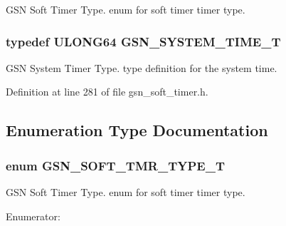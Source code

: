 GSN Soft Timer Type. enum for soft timer timer type. 

\hypertarget{a00673_gad1e755eb904493a09bf8df25a4519bf0}{
\subsubsection[{GSN\_\-SYSTEM\_\-TIME\_\-T}]{\setlength{\rightskip}{0pt plus 5cm}typedef {\bf ULONG64} {\bf GSN\_\-SYSTEM\_\-TIME\_\-T}}}
\label{a00673_gad1e755eb904493a09bf8df25a4519bf0}


GSN System Timer Type. type definition for the system time. 



Definition at line 281 of file gsn\_\-soft\_\-timer.h.



\subsection{Enumeration Type Documentation}
\hypertarget{a00673_ga599ea0a212c1bcd484a64610d070b5af}{
\subsubsection[{GSN\_\-SOFT\_\-TMR\_\-TYPE\_\-T}]{\setlength{\rightskip}{0pt plus 5cm}enum {\bf GSN\_\-SOFT\_\-TMR\_\-TYPE\_\-T}}}
\label{a00673_ga599ea0a212c1bcd484a64610d070b5af}


GSN Soft Timer Type. enum for soft timer timer type. 

\begin{Desc}
\item[Enumerator: ]\par
\begin{description}
\item[{\em 
\hypertarget{a00673_gga599ea0a212c1bcd484a64610d070b5afaed34a4f447dd6a4da5771c0a29d502c3}{
GSN\_\-SOFT\_\-TMR\_\-ONESHOT}
\label{a00673_gga599ea0a212c1bcd484a64610d070b5afaed34a4f447dd6a4da5771c0a29d502c3}
}]\item[{\em 
\hypertarget{a00673_gga599ea0a212c1bcd484a64610d070b5afa0fdc43c704fbf8c462b2e87ddc6aea6d}{
GSN\_\-SOFT\_\-TMR\_\-PERIODIC}
\label{a00673_gga599ea0a212c1bcd484a64610d070b5afa0fdc43c704fbf8c462b2e87ddc6aea6d}
}]\end{description}
\end{Desc}



